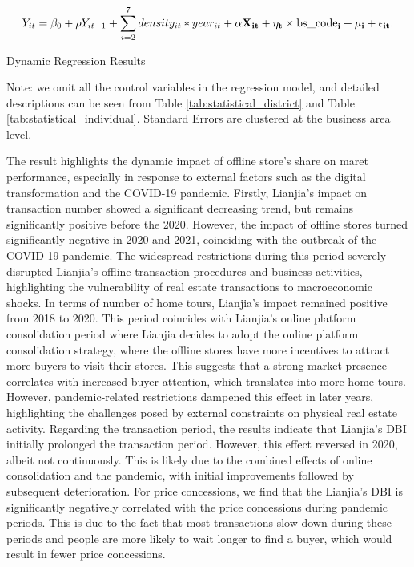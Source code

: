 \documentclass[11pt]{article}
\begin{document}
\begin{equation}
  Y_{it} = \beta_0 + \rho Y_{it-1} + \sum_{i=2}^7 density_{it} * year_{it} + \bf{\alpha} \bf{X}_{it} + \eta_{t} \times \text{bs\_code}_i + \mu_i + \epsilon_{it}. \label{eq:dynamic}
\end{equation}

\begin{table}[H]
  \begin{center}
    \begin{scriptsize}
    \caption{Dynamic Regression Results}
    \label{tab:Dynamic}
    

    Note: we omit all the control variables in the regression model, and detailed descriptions can be seen from Table \ref{tab:statistical_district} and Table \ref{tab:statistical_individual}. Standard Errors are clustered at the business area level.
    \end{scriptsize}
  \end{center}
\end{table}

The result highlights the dynamic impact of offline store's share on maret performance, especially in response to external factors such as the digital transformation and the COVID-19 pandemic. Firstly, Lianjia's impact on transaction number showed a significant decreasing trend, but remains significantly positive before the 2020. However, the impact of offline stores turned significantly negative in 2020 and 2021, coinciding with the outbreak of the COVID-19 pandemic. The widespread restrictions during this period severely disrupted Lianjia's offline transaction procedures and business activities, highlighting the vulnerability of real estate transactions to macroeconomic shocks. In terms of number of home tours, Lianjia's impact remained positive from 2018 to 2020. This period coincides with Lianjia's online platform consolidation period where Lianjia decides to adopt the online platform consolidation strategy, where the offline stores have more incentives to attract more buyers to visit their stores. This suggests that a strong market presence correlates with increased buyer attention, which translates into more home tours. However, pandemic-related restrictions dampened this effect in later years, highlighting the challenges posed by external constraints on physical real estate activity. Regarding the transaction period, the results indicate that Lianjia's DBI initially prolonged the transaction period. However, this effect reversed in 2020, albeit not continuously. This is likely due to the combined effects of online consolidation and the pandemic, with initial improvements followed by subsequent deterioration. For price concessions, we find that the Lianjia's DBI is significantly negatively correlated with the price concessions during pandemic periods. This is due to the fact that most transactions slow down during these periods and people are more likely to wait longer to find a buyer, which would result in fewer price concessions.
\end{document}
